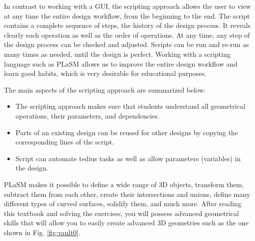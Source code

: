 

In contrast to working with a GUI, the scripting approach
allows the user to view at any time the entire design workflow, from the beginning 
to the end. The script contains 
a complete sequence of steps, the history of the design process. It reveals clearly each 
operation as well as the order of operations. At any time, any step 
of the design process can be checked and adjusted. Scripts can be run and 
re-run as many times as needed, until the design is perfect. 
Working with a scripting language such as PLaSM allows us to improve the entire  
design workflow and learn good habits, which is very desirable for
educational purposes. 

The main aspects of the scripting approach are summarized
below:

\begin{itemize}

\item The scripting approach makes sure that students understand
      all geometrical operations, their parameters, and dependencies.
\item Parts of an existing design can be reused for other designs by copying the 
      corresponding lines of the script. 
\item Script can automate tedius tasks as well as allow parameters (variables)
      in the design. 
\end{itemize}
PLaSM makes it possible to define a wide range of 3D 
objects, transform them, subtract them from each other, create their intersections
and unions, define many different types of curved surfaces, solidify them, and 
much more. After reading this textbook and solving the exercises, you will possess
advanced geometrical skills that will allow you to easily create advanced 3D geometries 
such as the one shown in Fig. \ref{fig:vault0}.
\newpage

